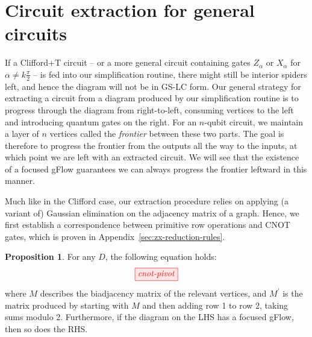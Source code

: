 \documentclass[a4paper,onecolumn,superscriptaddress,11pt,accepted=2020-04-27]{quantumarticle}
\theoremstyle{definition}
\newtheorem{proposition}[theorem]{Proposition}
\begin{document}
\section{Circuit extraction for general circuits}\label{sec:cliffordT}

If a Clifford+T circuit -- or a more general circuit containing gates $Z_\alpha$ or $X_\alpha$ for $\alpha \neq k\frac\pi2$ -- is fed into our simplification routine, there might still be interior spiders left, and hence the diagram will not be in GS-LC form. %
Our general strategy for extracting a circuit from a diagram produced by our simplification routine is to progress through the diagram from right-to-left, consuming vertices to the left and introducing quantum gates on the right. For an $n$-qubit circuit, we maintain a layer of $n$ vertices called the \textit{frontier} between these two parts. The goal is therefore to progress the frontier from the outputs all the way to the inputs, at which point we are left with an extracted circuit. We will see that the existence of a focused gFlow guarantees we can always progress the frontier leftward in this manner.

Much like in the Clifford case, our extraction procedure relies on applying (a variant of) Gaussian elimination on the adjacency matrix of a graph. Hence, we first establish a correspondence between primitive row operations and CNOT gates, which is proven in Appendix~\ref{sec:zx-reduction-rules}.

\begin{proposition}\label{prop:cnotgflow}
  For any \zxdiagram $D$, the following equation holds:
  \begin{equation*}
  \scalebox{1.0}{\tikzfig{cnot-pivot}}
  \end{equation*}
  where $M$ describes the biadjacency matrix of the relevant vertices, and $M^\prime$ is the matrix produced by starting with $M$ and then adding row 1 to row 2, taking sums modulo 2. Furthermore, if the diagram on the LHS has a focused gFlow, then so does the RHS.
\end{proposition}

\end{document}
